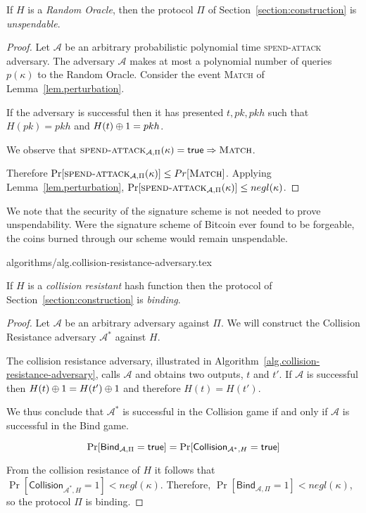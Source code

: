 \begin{theorem}[Unspendability]
  If $H$ is a \emph{Random Oracle}, then the protocol $\Pi$ of Section~\ref{section:construction} is \emph{unspendable}.
\end{theorem}
\begin{proof}
  Let $\mathcal{A}$ be an arbitrary probabilistic polynomial time \textsc{spend-attack} adversary.
  The adversary $\mathcal{A}$ makes at most a polynomial number of queries $p(\kappa)$ to the Random Oracle.
  Consider the event \textsc{Match} of Lemma~\ref{lem.perturbation}.

  If the adversary is successful then it has presented $t, pk, pkh$ such that $H(pk) = pkh$ and $H(t) \oplus 1 = pkh$.

  We observe that $\textsc{spend-attack}_{\mathcal{A}, \Pi}(\kappa) = \mathsf{true} \Rightarrow \textsc{Match}$.

  Therefore $\Pr[\textsc{spend-attack}_{\mathcal{A}, \Pi}(\kappa)] \leq Pr[\textsc{Match}]$. Applying Lemma~\ref{lem.perturbation}, $\Pr[\textsc{spend-attack}_{\mathcal{A}, \Pi}(\kappa)] \leq negl(\kappa)$.
\end{proof}

We note that the security of the signature scheme is not needed to prove unspendability. Were the signature scheme of Bitcoin ever found to be forgeable, the coins burned through our scheme would remain unspendable.

{algorithms/alg.collision-resistance-adversary.tex}

\begin{theorem}[Binding]
  If $H$ is a \emph{collision resistant} hash function then the protocol of Section~\ref{section:construction} is \emph{binding}.
\end{theorem}
\begin{proof}
  Let $\mathcal{A}$ be an arbitrary adversary against $\Pi$.
  We will construct the Collision Resistance adversary $\mathcal{A}^*$ against $H$.

  The collision resistance adversary, illustrated in Algorithm~\ref{alg.collision-resistance-adversary}, calls $\mathcal{A}$ and obtains two outputs, $t$ and $t'$. If $\mathcal{A}$ is successful then $H(t) \oplus 1 = H(t') \oplus 1$ and therefore $H(t) = H(t')$.

  We thus conclude that $\mathcal{A^*}$ is successful in the \textsf{Collision} game if and only if $\mathcal{A}$ is successful in the \textsf{Bind} game.

  \[
    \Pr[\textsf{Bind}_{\mathcal{A},\Pi} = \mathsf{true}]
    =
    \Pr[\textsf{Collision}_{\mathcal{A}^*,H} = \mathsf{true}]
  \]

  From the collision resistance of $H$ it follows that $\Pr[\textsf{Collision}_{\mathcal{A}^*,H} = 1] < negl(\kappa)$. Therefore,
  $\Pr[\textsf{Bind}_{\mathcal{A},\Pi} = 1] < negl(\kappa)$, so
  the protocol $\Pi$ is binding.
\end{proof}

